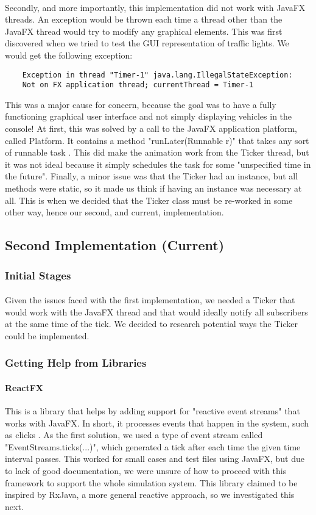 \documentclass[a4paper,11pt,titlepage]{article}
\begin{document}
\paragraph{}
Secondly, and more importantly, this implementation did not work with JavaFX threads. An exception would be thrown each time a thread other than the JavaFX thread would try to modify any graphical elements. This was first discovered when we tried to test the GUI representation of traffic lights. We would get the following exception:
\begin{lstlisting}
	Exception in thread "Timer-1" java.lang.IllegalStateException:
	Not on FX application thread; currentThread = Timer-1
\end{lstlisting}
This was a major cause for concern, because the goal was to have a fully functioning graphical user interface and not simply displaying vehicles in the console! At first, this was solved by a call to the JavaFX application platform, called Platform. It contains a method "runLater(Runnable r)" that takes any sort of runnable task \cite{platform}. This did make the animation work from the Ticker thread, but it was not ideal because it simply schedules the task for some "unspecified time in the future". Finally, a minor issue was that the Ticker had an instance, but all methods were static, so it made us think if having an instance was necessary at all. This is when we decided that the Ticker class must be re-worked in some other way, hence our second, and current, implementation.
\subsection{Second Implementation (Current)}
\subsubsection{Initial Stages}
\paragraph{}
Given the issues faced with the first implementation, we needed a Ticker that would work with the JavaFX thread and that would ideally notify all subscribers at the same time of the tick. We decided to research potential ways the Ticker could be implemented.
\subsubsection{Getting Help from Libraries}
\paragraph{ReactFX}
This is a library that helps by adding support for "reactive event streams" that works with JavaFX. In short, it processes events that happen in the system, such as clicks \cite{reactfx}. As the first solution, we used a type of event stream called "EventStreams.ticks(...)", which generated a tick after each time the given time  interval passes. This worked for small cases and test files using JavaFX, but due to lack of good documentation, we were unsure of how to proceed with this framework to support the whole simulation system. This library claimed to be inspired by RxJava, a more general reactive approach, so we investigated this next.
\end{document}
